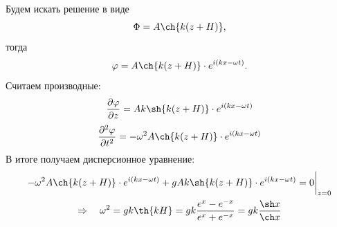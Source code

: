 Будем искать решение в виде
\begin{equation}
	\Phi=A\ch{k(z+H)},
\end{equation}
тогда
\begin{equation}
	\phi=A\ch{k(z+H)}\cdot e^{i(kx- \omega t)}.
\end{equation}
Считаем производные:
\begin{equation}
	\pdv{\phi}{z}=Ak\sh{k(z+H)}\cdot e^{i(kx- \omega t)}
\end{equation}
\begin{equation}
	\pdv[2]{\phi}{t}=-\omega^2A\ch{k(z+H)}\cdot e^{i(kx- \omega t)}
\end{equation}
В итоге получаем дисперсионное уравнение:
\begin{gather}
	\label{eq:disp}
	-\omega^2A\ch{k(z+H)}\cdot e^{i(kx- \omega t)}+gAk\sh{k(z+H)}\cdot e^{i(kx- \omega t)}=0 \bigg|_{z=0}
	\\ \Rightarrow \quad
	\omega^2=gk\th{kH} = gk \frac{e^x-e^{-x}}{e^{x}+e^{-x}} = gk\frac{\sh x}{\ch x}
\end{gather}






